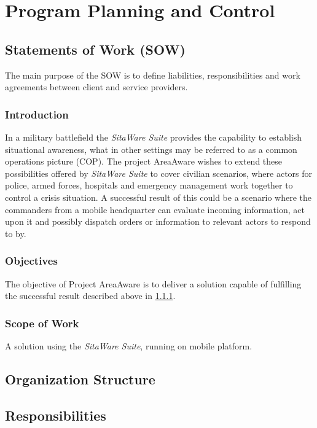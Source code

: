 %
\thispagestyle{fancy}
\chapter{Program Planning and Control}
\label{chp:program_plan}


\section{Statements of Work (SOW)}
The main purpose of the SOW is to define liabilities, responsibilities and work agreements between client and service providers.

\subsection{Introduction}\label{sec:sow_intro}
In a military battlefield the \emph{SitaWare Suite} provides the capability to establish situational awareness, what in other settings may be referred to as a common operations picture (COP).
The project AreaAware wishes to extend these possibilities offered by \emph{SitaWare Suite} to cover civilian scenarios, where actors for police, armed forces, hospitals and emergency management work together to control a crisis situation.
A successful result of this could be a scenario where the commanders from a mobile headquarter can evaluate incoming information, act upon it and possibly dispatch orders or information to relevant actors to respond to by.

\subsection{Objectives}
The objective of Project AreaAware is to deliver a solution capable of fulfilling the successful result described above in \ref{sec:sow_intro}.

\subsection{Scope of Work}
A solution using the \emph{SitaWare Suite}, running on mobile platform.



\section{Organization Structure}


\section{Responsibilities}

